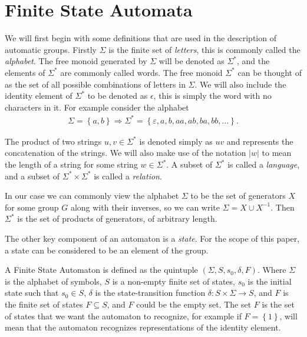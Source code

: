 \documentclass[10pt]{amsart}
\theoremstyle{definition}
\theoremstyle{remark}
\begin{document}
\section{Finite State Automata}%
\label{sec:finite_state_automata}

We will first begin with some definitions that are used in the description of
automatic groups. Firstly $\Sigma$ is the finite set of \textit{letters}, this
is commonly called the \textit{alphabet}. The free monoid generated by $\Sigma$
will be denoted as $\Sigma^*$, and the elements of $\Sigma^*$ are commonly
called words. The free monoid $\Sigma^*$ can be thought of as the set of all
possible combinations of letters in $\Sigma$. We will also include the identity
element of $\Sigma^*$ to be denoted as $\epsilon$, this is simply the word with
no characters in it. For example consider the alphabet
\begin{align*}
  \Sigma=\left\{a,b\right\}\Rightarrow\Sigma^*=\left\{\varepsilon, a,b,aa,ab,ba,bb,\ldots\right\}.
\end{align*}

The product of two strings $u,v\in\Sigma^*$ is denoted simply as $uv$ and
represents the concatenation of the strings. We will also make use of the
notation $|w|$ to mean the length of a string for some string $w\in\Sigma^*$. A
subset of $\Sigma^*$ is called a \textit{language}, and a subset of
$\Sigma^*\times\Sigma^*$ is called a \textit{relation}.

In our case we can commonly view the alphabet $\Sigma$ to be the set of
generators $X$ for some group $G$ along with their inverses, so we can write
$\Sigma=X\cup X^{-1}$. Then $\Sigma^*$ is the set of products of
generators, of arbitrary length.

The other key component of an automaton is a \textit{state}. For the scope of
this paper, a state can be considered to be an element of the group.

A Finite State Automaton is defined as the quintuple $\left(\Sigma, S, s_0,
  \delta, F\right)$. Where $\Sigma$ is the alphabet of symbols, $S$ is a
non-empty finite set of states, $s_0$ is the initial state such that $s_0\in
S$, $\delta$ is the state-transition function $\delta:S\times\Sigma\rightarrow
S$, and $F$ is the finite set of states $F\subseteq S$, and $F$ could be the
empty set. The set $F$ is the set of states that we want the automaton to
recognize, for example if $F=\left\{1\right\}$, will mean that the automaton
recognizes representations of the identity element.
\end{document}
